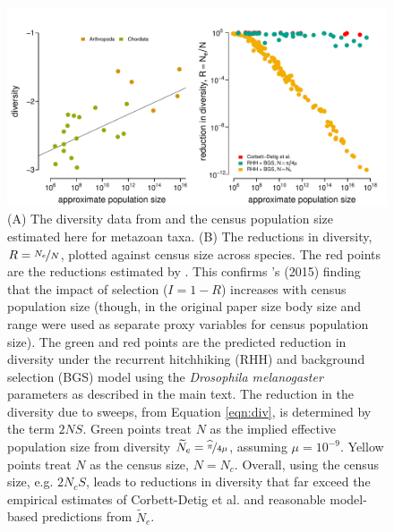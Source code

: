 \documentclass[11pt]{article}
\begin{document}
\begin{figure}[!htb]
  \centering
  \includegraphics[width=\textwidth]{figures/corbett_detig.pdf}

  \caption{(A) The diversity data from \textcite{Corbett-Detig2015-gt} and the
    census population size estimated here for metazoan taxa. (B) The
    reductions in diversity, $R = \nicefrac{N_e}{N}$, plotted against census
    size across species. The red points are the reductions estimated by
    \textcite{Corbett-Detig2015-gt}. This confirms
    \citeauthor{Corbett-Detig2015-gt}'s (2015) finding that the impact of
    selection ($I = 1-R$) increases with census population size (though, in the
    original paper size body size and range were used as separate proxy
    variables for census population size). The green and red points are the
    predicted reduction in diversity under the recurrent hitchhiking (RHH) and
    background selection (BGS) model using the \emph{Drosophila melanogaster}
    parameters as described in the main text.  The reduction in the diversity
    due to sweeps, from Equation \eqref{eqn:div}, is determined by the term
    $2NS$.  Green points treat $N$ as the implied effective population size
    from diversity $\widetilde{N}_e = \nicefrac{\widehat{\pi}}{4\mu}$, assuming
    $\mu = 10^{-9}$. Yellow points treat $N$ as the census size, $N = N_c$.
    Overall, using the census size, e.g.  $2N_cS$, leads to reductions in
    diversity that far exceed the empirical estimates of Corbett-Detig et al.
  and reasonable model-based predictions from $\widetilde{N}_e$.}

  \label{suppfig:corbett_detig}
\end{figure}
\end{document}
